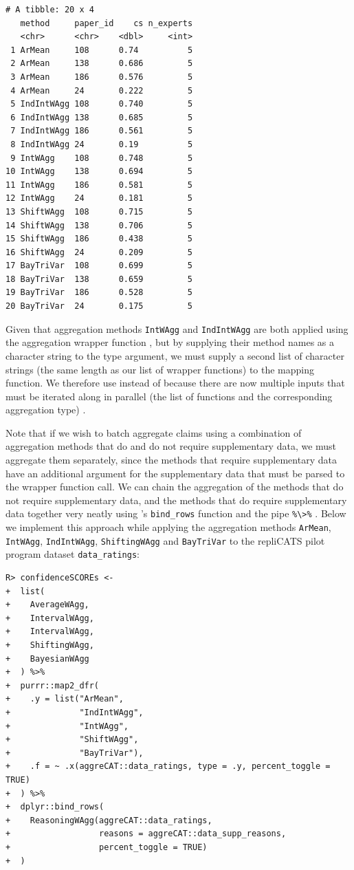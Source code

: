 \documentclass[article]{jss}
\newcommand{\fct}[1]{\code{#1()}}
\begin{document}
\begin{verbatim}
# A tibble: 20 x 4
   method     paper_id    cs n_experts
   <chr>      <chr>    <dbl>     <int>
 1 ArMean     108      0.74          5
 2 ArMean     138      0.686         5
 3 ArMean     186      0.576         5
 4 ArMean     24       0.222         5
 5 IndIntWAgg 108      0.740         5
 6 IndIntWAgg 138      0.685         5
 7 IndIntWAgg 186      0.561         5
 8 IndIntWAgg 24       0.19          5
 9 IntWAgg    108      0.748         5
10 IntWAgg    138      0.694         5
11 IntWAgg    186      0.581         5
12 IntWAgg    24       0.181         5
13 ShiftWAgg  108      0.715         5
14 ShiftWAgg  138      0.706         5
15 ShiftWAgg  186      0.438         5
16 ShiftWAgg  24       0.209         5
17 BayTriVar  108      0.699         5
18 BayTriVar  138      0.659         5
19 BayTriVar  186      0.528         5
20 BayTriVar  24       0.175         5
\end{verbatim}

Given that aggregation methods \texttt{IntWAgg} and \texttt{IndIntWAgg}
are both applied using the aggregation wrapper function
\fct{IntervalWAgg}, but by supplying their method names as a character
string to the {type} argument, we must supply a second list of character
strings (the same length as our list of wrapper functions) to the
mapping function. We therefore use \fct{map2\_dfr} instead of
\fct{map\_dfr} because there are now multiple inputs that must be
iterated along in parallel (the list of functions and the corresponding
aggregation {type}) \citep{wickham2017b}.

Note that if we wish to batch aggregate claims using a combination of
aggregation methods that do and do not require supplementary data, we
must aggregate them separately, since the methods that require
supplementary data have an additional argument for the supplementary
data that must be parsed to the wrapper function call. We can chain the
aggregation of the methods that do not require supplementary data, and
the methods that do require supplementary data together very neatly
using 's \texttt{bind\_rows} function \citep{dplyr2021} and
the \fct{magrittr} pipe \texttt{\%\textbackslash{}\textgreater{}\%}
\citep{magrittr2020}. Below we implement this approach while applying
the aggregation methods \texttt{ArMean}, \texttt{IntWAgg},
\texttt{IndIntWAgg}, \texttt{ShiftingWAgg} and \texttt{BayTriVar} to the
repliCATS pilot program dataset \texttt{data\_ratings}:

\begin{verbatim}
R> confidenceSCOREs <-
+  list(
+    AverageWAgg,
+    IntervalWAgg,
+    IntervalWAgg,
+    ShiftingWAgg,
+    BayesianWAgg
+  ) %>%
+  purrr::map2_dfr(
+    .y = list("ArMean", 
+              "IndIntWAgg", 
+              "IntWAgg", 
+              "ShiftWAgg", 
+              "BayTriVar"),
+    .f = ~ .x(aggreCAT::data_ratings, type = .y, percent_toggle = TRUE)
+  ) %>% 
+  dplyr::bind_rows(
+    ReasoningWAgg(aggreCAT::data_ratings, 
+                  reasons = aggreCAT::data_supp_reasons, 
+                  percent_toggle = TRUE)
+  )
\end{verbatim}
\end{document}
